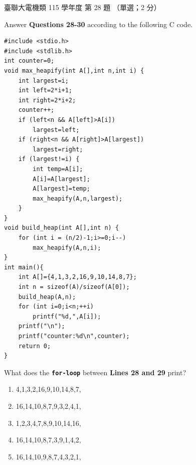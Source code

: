 \begin{pastexam}[label={px:ust-115-ee-ds-28}]{臺聯大電機類 115 學年度 第 28 題}
（單選；2 分）

Answer \textbf{Questions 28-30} according to the following C code.
\begin{verbatim}
#include <stdio.h>
#include <stdlib.h>
int counter=0;
void max_heapify(int A[],int n,int i) {
    int largest=i;
    int left=2*i+1;
    int right=2*i+2;
    counter++;
    if (left<n && A[left]>A[i])
        largest=left;
    if (right<n && A[right]>A[largest])
        largest=right;
    if (largest!=i) {
        int temp=A[i];
        A[i]=A[largest];
        A[largest]=temp;
        max_heapify(A,n,largest);
    }
}
void build_heap(int A[],int n) {
    for (int i = (n/2)-1;i>=0;i--)
        max_heapify(A,n,i);
}
int main(){
    int A[]={4,1,3,2,16,9,10,14,8,7};
    int n = sizeof(A)/sizeof(A[0]);
    build_heap(A,n);
    for (int i=0;i<n;++i)
        printf("%d,",A[i]);
    printf("\n");
    printf("counter:%d\n",counter);
    return 0;
}
\end{verbatim}

What does the \texttt{\textbf{for-loop}} between \textbf{Lines 28 and 29} print?
\begin{enumerate}[label=(\Alph*)]
\item 4,1,3,2,16,9,10,14,8,7,
\item 16,14,10,8,7,9,3,2,4,1,
\item 1,2,3,4,7,8,9,10,14,16,
\item 16,14,10,8,7,3,9,1,4,2,
\item 16,14,10,9,8,7,4,3,2,1,
\end{enumerate}
\end{pastexam}


